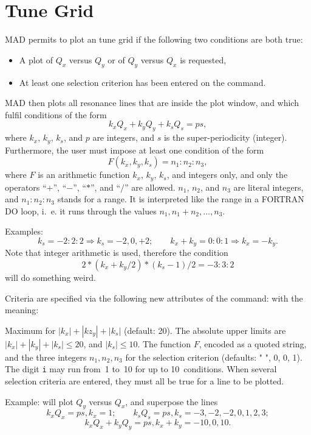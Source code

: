 \section{Tune Grid}
MAD permits to plot an tune grid if the following two conditions
are both true:
\begin{itemize}
\item A plot of \(Q_x\) versus \(Q_y\) or of \(Q_y\) versus \(Q_x\)
is requested,
\item At least one selection criterion has been entered on the 
command.
\end{itemize}
MAD then plots all resonance lines that are inside the plot window,
and which fulfil conditions of the form
\[ k_x Q_x + k_y Q_y + k_s Q_s = p s, \]
where \(k_x\), \(k_y\), \(k_s\), and \(p\) are integers,
and \(s\) is the super-periodicity (integer).
Furthermore, the user must impose at least one condition of the form
\[ F(k_x,k_y,k_s)=n_1:n_2:n_3, \]
where \(F\) is an arithmetic function \(k_x\), \(k_y\), \(k_s\),
and integers only,
and only the operators ``\(+\)'', ``\(-\)'', ``\(*\)'',
and ``\(/\)'' are allowed.
\(n_1\), \(n_2\), and \(n_3\) are literal integers,
and \(n_1:n_2:n_3\) stands for a range.
It is interpreted like the range in a FORTRAN DO loop,
i.~e. it runs through the values \(n_1, n_1 + n_2, \ldots , n_3\).

Examples:
\[
k_s = -2:2:2 \Rightarrow k_s = -2, 0, +2; \qquad
k_x + k_y = 0:0:1 \Rightarrow k_x = - k_y.
\]
Note that integer arithmetic is used, therefore the condition
\[ 2 * (k_x + k_y / 2) * (k_s - 1) / 2 = -3:3:2 \]
will do something weird.

Criteria are specified via the following new attributes of the
 command:
with the meaning:
\begin{mylist}
Maximum for \(|k_x| + |kz_y| + |k_s|\) (default: 20).
The absolute upper limits are \(|k_x| + |k_y| + |k_s| \le 20\),
and \(|k_s| \le 10\).
The function \(F\), encoded as a quoted string,
and the three integers \(n_1,n_2,n_3\) for the selection criterion
(defaults: " ", 0, 0, 1).
The digit {\tt i} may run from~1 to~10 for up to 10~conditions.
When several selection criteria are entered,
they must all be true for a line to be plotted.
\end{mylist}
\noindent Example:
will plot \(Q_y\) versus \(Q_x\),
and superpose the lines
\[ k_x Q_x = p s, k_x = 1; \qquad
k_s Q_s = p s, k_s = -3, -2, -2, 0, 1, 2, 3; \]
\[ k_x Q_x + k_y Q_y = p s, k_x + k_y = -10, 0, 10. \]

